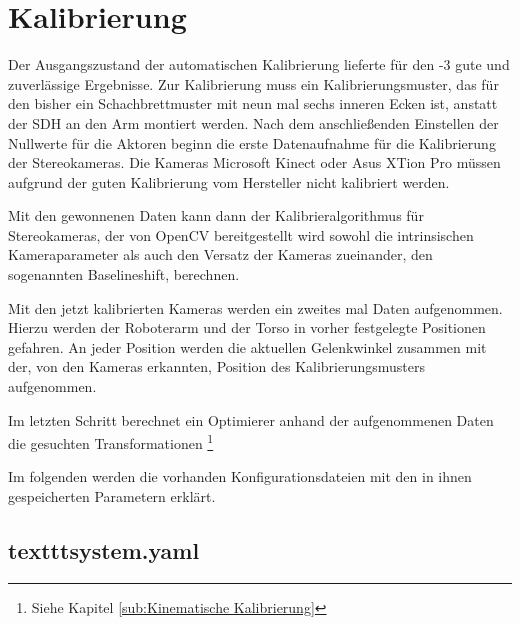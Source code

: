 \section{Kalibrierung}

Der Ausgangszustand der automatischen Kalibrierung lieferte für den -3
gute und zuverlässige Ergebnisse. Zur Kalibrierung muss ein
Kalibrierungsmuster, das für den \cob bisher ein Schachbrettmuster mit neun mal
sechs inneren Ecken \cite{opencv_chessboard} ist, anstatt der \ac{SDH} an
den Arm montiert werden. Nach dem anschließenden Einstellen der Nullwerte für
die Aktoren beginn die erste Datenaufnahme für die Kalibrierung der
Stereokameras. Die Kameras Microsoft Kinect oder Asus XTion Pro müssen aufgrund der
guten Kalibrierung vom Hersteller nicht kalibriert werden. 

Mit den gewonnenen Daten kann dann der Kalibrieralgorithmus für Stereokameras,
der von OpenCV bereitgestellt wird sowohl die intrinsischen Kameraparameter als
auch den Versatz der Kameras zueinander, den sogenannten Baselineshift,
berechnen.

Mit den jetzt kalibrierten Kameras werden ein zweites mal Daten aufgenommen.
Hierzu werden der Roboterarm und der Torso in vorher festgelegte Positionen
gefahren. An jeder Position werden die aktuellen Gelenkwinkel zusammen mit der,
von den Kameras erkannten, Position des Kalibrierungsmusters aufgenommen.

Im letzten Schritt berechnet ein Optimierer anhand der aufgenommenen Daten die
gesuchten Transformationen \footnote{Siehe Kapitel \ref{sub:Kinematische Kalibrierung}}\cite{Haug2012}



Im folgenden werden die vorhanden Konfigurationsdateien mit den in ihnen
gespeicherten Parametern erklärt.



\subsection{texttt{system.yaml}}

